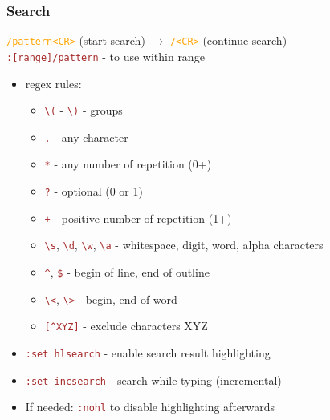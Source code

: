 \documentclass{beamer}
\newcommand{\vimnormal}[1]{\texttt{\textcolor{orange}{#1}}}
\newcommand{\vimcommand}[1]{\texttt{\textcolor{brown}{#1}}}
\newcommand{\vimkey}[1]{\textless{}#1\textgreater{}}
\begin{document}
\begin{frame}
    \frametitle{Search}
    \vimnormal{/pattern\vimkey{CR}} (start search) $\rightarrow$ \vimnormal{/\vimkey{CR}} (continue search)\\
    \vimcommand{:[range]/pattern} - to use within range
    \begin{itemize}
        \item regex rules:
        \begin{itemize}
            \item \vimcommand{\textbackslash{(}} - \vimcommand{\textbackslash{)}} - groups
            \item \vimcommand{.} - any character
            \item \vimcommand{*} - any number of repetition (0+)
            \item \vimcommand{?} - optional (0 or 1)
            \item \vimcommand{+} - positive number of repetition (1+)
            \item \vimcommand{\textbackslash{s}}, \vimcommand{\textbackslash{d}}, \vimcommand{\textbackslash{w}}, \vimcommand{\textbackslash{a}} - whitespace, digit, word, alpha characters
            \item \vimcommand{\string^}, \vimcommand{\$} - begin of line, end of outline
            \item \vimcommand{\textbackslash{\textless}}, \vimcommand{\textbackslash{\textgreater}} - begin, end of word
            \item \vimcommand{[\string^XYZ]} - exclude characters XYZ
        \end{itemize}
        \item \vimcommand{:set hlsearch} - enable search result highlighting
        \item \vimcommand{:set incsearch} - search while typing (incremental)
        \item If needed: \vimcommand{:nohl} to disable highlighting afterwards
    \end{itemize}
\end{frame}
\end{document}
